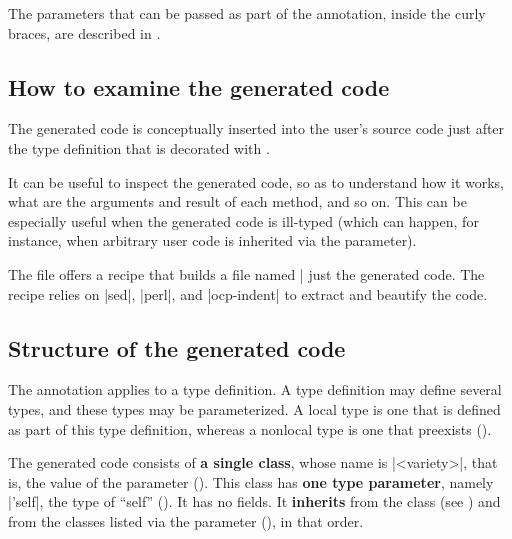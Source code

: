 \documentclass[11pt,a4paper,twoside]{article}
\renewcommand{\emph}[1]{\textbf{#1}}
\begin{document}
The parameters that can be passed as part of the \derivingvisitors annotation,
inside the curly braces, are described in .


\subsection{How to examine the generated code}

The generated code is conceptually inserted into the user's source code just
after the type definition that is decorated with \derivingvisitors.

It can be useful to inspect the generated code, so as to understand how it
works, what are the arguments and result of each method, and so on. This can
be especially useful when the generated code is ill-typed (which can happen,
for instance, when arbitrary user code is inherited via the \ancestors
parameter).

The file  offers a recipe that builds a file
named \oc|%
just the generated code. The recipe relies on \oc|sed|, \oc|perl|, and
\oc|ocp-indent| to extract and beautify the code.


\subsection{Structure of the generated code}
\label{sec:structure}

The \derivingvisitors annotation applies to a type definition. A type
definition may define several types, and these types may be parameterized. A
local type is one that is defined as part of this type definition, whereas a
nonlocal type is one that preexists ().

The generated code consists of \emph{a single class}, whose name is \oc|<variety>|,
that is, the value of the \variety parameter (). This class
has \emph{one type parameter}, namely \oc|'self|, the type of ``self''
(). It has no fields. It \emph{inherits} from the class
 (see ) and from the classes
listed via the \ancestors parameter (), in that order.
\end{document}
